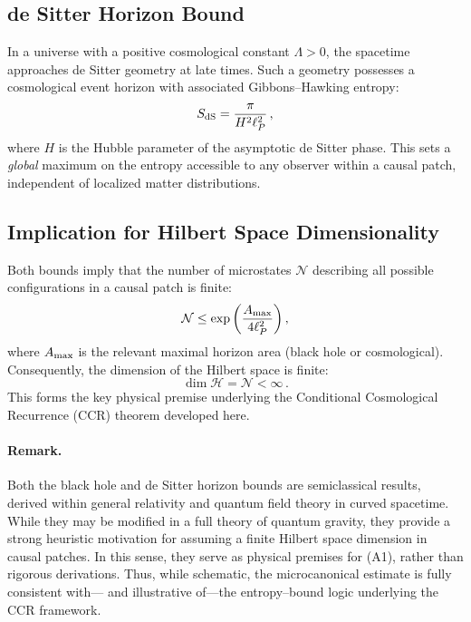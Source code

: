 \documentclass[12pt]{article}
\theoremstyle{remark}
\begin{document}
\subsection{de Sitter Horizon Bound}
In a universe with a positive cosmological constant $\Lambda > 0$, the spacetime approaches de Sitter geometry at late times.
Such a geometry possesses a cosmological event horizon with associated Gibbons--Hawking entropy:
\begin{equation}
S_{\rm dS} = \frac{\pi}{H^2 \ell_P^2} \, ,
\end{equation}
where $H$ is the Hubble parameter of the asymptotic de Sitter phase.
This sets a \emph{global} maximum on the entropy accessible to any observer within a causal patch, independent of localized matter distributions.

\subsection{Implication for Hilbert Space Dimensionality}
Both bounds imply that the number of microstates $\mathcal{N}$ describing all possible configurations in a causal patch is finite:
\begin{equation}
\mathcal{N} \le \exp\left( \frac{A_{\rm max}}{4 \ell_P^2} \right) ,
\end{equation}
where $A_{\rm max}$ is the relevant maximal horizon area (black hole or cosmological).
Consequently, the dimension of the Hilbert space is finite:
\begin{equation}
\dim \mathcal{H} = \mathcal{N} < \infty \, .
\end{equation}
This forms the key physical premise underlying the Conditional Cosmological Recurrence (CCR) theorem developed here.

\paragraph{Remark.}
Both the black hole and de Sitter horizon bounds are semiclassical results,
derived within general relativity and quantum field theory in curved spacetime.
While they may be modified in a full theory of quantum gravity, they provide
a strong heuristic motivation for assuming a finite Hilbert space dimension
in causal patches. In this sense, they serve as physical premises for (A1),
rather than rigorous derivations.
Thus, while schematic, the microcanonical estimate is fully consistent with—
and illustrative of—the entropy–bound logic underlying the CCR framework.
\end{document}
